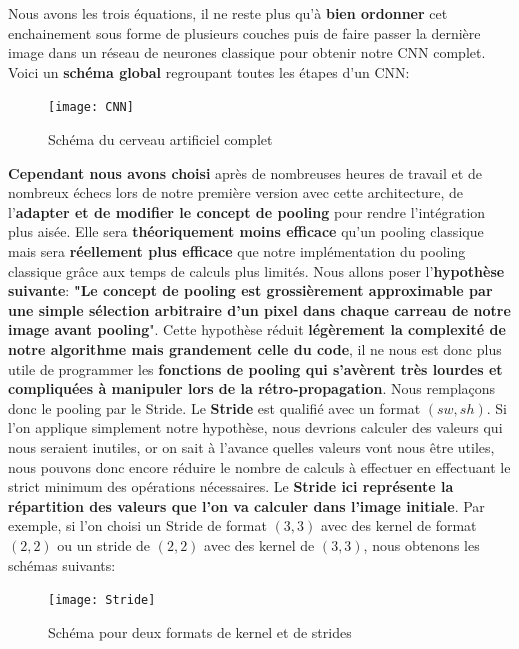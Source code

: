 \documentclass[12pt,a4paper]{extarticle}
\begin{document}
Nous avons les trois équations, il ne reste plus qu'à \textbf{bien ordonner }cet enchainement sous forme de plusieurs couches puis de faire passer la dernière image dans un réseau de neurones classique pour obtenir notre CNN complet. Voici un \textbf{schéma global} regroupant toutes les étapes d'un CNN:
\begin{figure}[h]
\centering
\texttt{[image: CNN]}
\caption{Schéma du cerveau artificiel complet}
\end{figure}


\textbf{Cependant nous avons choisi} après de nombreuses heures de travail et de nombreux échecs lors de notre première version avec cette architecture, de l'\textbf{adapter et de modifier le concept de pooling} pour rendre l'intégration plus aisée. Elle sera \textbf{théoriquement moins efficace} qu'un pooling classique mais sera \textbf{réellement plus efficace} que notre implémentation du pooling classique grâce aux temps de calculs plus limités. Nous allons poser l'\textbf{hypothèse suivante}: \textbf{"Le concept de pooling est grossièrement approximable par une simple sélection arbitraire d'un pixel dans chaque carreau de notre image avant pooling}". Cette hypothèse réduit \textbf{légèrement la complexité de notre algorithme mais grandement celle du code}, il ne nous est donc plus utile de programmer les \textbf{fonctions de pooling qui s'avèrent très lourdes et compliquées à manipuler lors de la rétro-propagation}. Nous remplaçons donc le pooling par le Stride. Le \textbf{Stride }est qualifié avec un format $(sw, sh)$. Si l'on applique simplement notre hypothèse, nous devrions calculer des valeurs qui nous seraient inutiles, or on sait à l'avance quelles valeurs vont nous être utiles, nous pouvons donc encore réduire le nombre de calculs à effectuer en effectuant le strict minimum des opérations nécessaires. Le \textbf{Stride ici représente la répartition des valeurs que l'on va calculer dans l'image initiale}. Par exemple, si l'on choisi un Stride de format $(3,3)$ avec des kernel de format $(2,2)$ ou un stride de $(2,2)$ avec des kernel de $(3,3)$, nous obtenons les schémas suivants:\\
\begin{figure}[h]
\centering
\texttt{[image: Stride]}
\caption{Schéma pour deux formats de kernel et de strides}
\end{figure}
\end{document}
